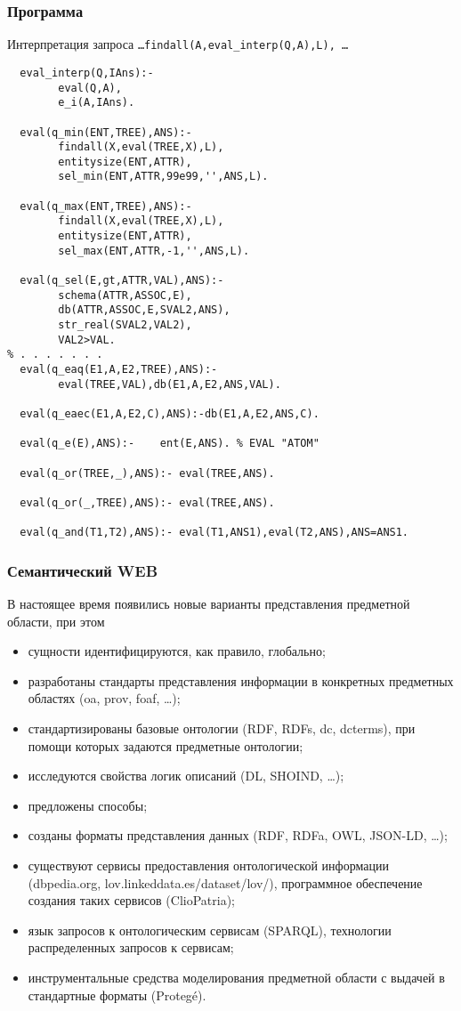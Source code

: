 \documentclass[10pt]{beamer}
\begin{document}
\begin{frame}[fragile]
  \frametitle{Программа}
  Интерпретация запроса \texttt{\ldots findall(A,eval\_interp(Q,A),L), \ldots}
\begin{verbatim}
  eval_interp(Q,IAns):-
		eval(Q,A),
		e_i(A,IAns).

  eval(q_min(ENT,TREE),ANS):-
		findall(X,eval(TREE,X),L),
		entitysize(ENT,ATTR),
		sel_min(ENT,ATTR,99e99,'',ANS,L).

  eval(q_max(ENT,TREE),ANS):-
		findall(X,eval(TREE,X),L),
		entitysize(ENT,ATTR),
		sel_max(ENT,ATTR,-1,'',ANS,L).

  eval(q_sel(E,gt,ATTR,VAL),ANS):-
		schema(ATTR,ASSOC,E),
		db(ATTR,ASSOC,E,SVAL2,ANS),
		str_real(SVAL2,VAL2),
		VAL2>VAL.
% . . . . . . .
  eval(q_eaq(E1,A,E2,TREE),ANS):-
		eval(TREE,VAL),db(E1,A,E2,ANS,VAL).

  eval(q_eaec(E1,A,E2,C),ANS):-db(E1,A,E2,ANS,C).

  eval(q_e(E),ANS):-	ent(E,ANS). % EVAL "ATOM"

  eval(q_or(TREE,_),ANS):- eval(TREE,ANS).

  eval(q_or(_,TREE),ANS):- eval(TREE,ANS).

  eval(q_and(T1,T2),ANS):- eval(T1,ANS1),eval(T2,ANS),ANS=ANS1.
\end{verbatim}
\end{frame}

\begin{frame}[fragile]
  \frametitle{Семантический WEB}
  В настоящее время появились новые варианты представления предметной области, при этом
  \begin{itemize}
  \item сущности идентифицируются, как правило, глобально;
  \item разработаны стандарты представления информации в конкретных предметных областях (oa, prov, foaf, \ldots);
  \item стандартизированы базовые онтологии (RDF, RDFs, dc, dcterms), при помощи которых задаются предметные онтологии;
  \item исследуются свойства логик описаний (DL, SHOIND, \ldots);
  \item предложены способы;
  \item созданы форматы представления данных (RDF, RDFa, OWL, JSON-LD, \ldots);
  \item существуют сервисы предоставления онтологической информации (dbpedia.org, lov.linkeddata.es/dataset/lov/), программное обеспечение создания таких сервисов (ClioPatria);
  \item язык запросов к онтологическим сервисам (SPARQL), технологии распределенных запросов к сервисам;
  \item инструментальные средства моделирования предметной области с выдачей в стандартные форматы (Proteg\'e).
  \end{itemize}
\end{frame}
\end{document}
